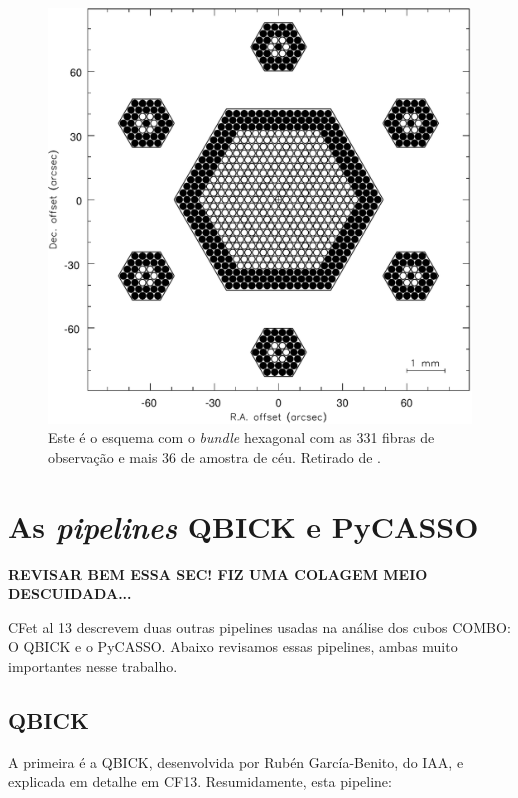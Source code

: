 \begin{figure}
    \includegraphics[height=0.5\textwidth]{figuras/figVerheijen2004Fig5.pdf}
    \caption[Configura\c{c}\~ao do {\em bundle} de fibras do PPMAS/PPAK.]
    {Este é o esquema com o {\em bundle} hexagonal com as 331 fibras de
    observação e mais 36 de amostra de céu. Retirado de \citet{Verheijen2004}.}
    \label{fig:BundlePPAK}
\end{figure}



\section{As  {\em pipelines} QBICK e PyCASSO}
\label{sec:CALePyC:PyCASSO}

{\bf\ojo REVISAR BEM ESSA SEC! FIZ UMA COLAGEM MEIO DESCUIDADA...}

CFet al 13 descrevem duas outras pipelines usadas na análise dos cubos COMBO: O QBICK e o PyCASSO. Abaixo revisamos
essas pipelines, ambas muito importantes nesse trabalho.

\subsection{QBICK}

A primeira é a QBICK, desenvolvida por Rubén García-Benito, do IAA, e explicada em detalhe em CF13. Resumidamente, esta
pipeline:

